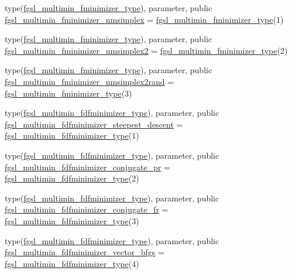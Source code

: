 \begin{DoxyCompactItemize}
\item 
type(\hyperlink{structfgsl_1_1fgsl__multimin__fminimizer__type}{fgsl\+\_\+multimin\+\_\+fminimizer\+\_\+type}), parameter, public \hyperlink{namespacefgsl_ab2e841755e0db0b740c913a9ca231417}{fgsl\+\_\+multimin\+\_\+fminimizer\+\_\+nmsimplex} = \hyperlink{structfgsl_1_1fgsl__multimin__fminimizer__type}{fgsl\+\_\+multimin\+\_\+fminimizer\+\_\+type}(1)
\item 
type(\hyperlink{structfgsl_1_1fgsl__multimin__fminimizer__type}{fgsl\+\_\+multimin\+\_\+fminimizer\+\_\+type}), parameter, public \hyperlink{namespacefgsl_a360e9e8ff70d499aedd5dbbdbdfd8404}{fgsl\+\_\+multimin\+\_\+fminimizer\+\_\+nmsimplex2} = \hyperlink{structfgsl_1_1fgsl__multimin__fminimizer__type}{fgsl\+\_\+multimin\+\_\+fminimizer\+\_\+type}(2)
\item 
type(\hyperlink{structfgsl_1_1fgsl__multimin__fminimizer__type}{fgsl\+\_\+multimin\+\_\+fminimizer\+\_\+type}), parameter, public \hyperlink{namespacefgsl_a1d64d873582c83a3e43c44d10ada296e}{fgsl\+\_\+multimin\+\_\+fminimizer\+\_\+nmsimplex2rand} = \hyperlink{structfgsl_1_1fgsl__multimin__fminimizer__type}{fgsl\+\_\+multimin\+\_\+fminimizer\+\_\+type}(3)
\item 
type(\hyperlink{structfgsl_1_1fgsl__multimin__fdfminimizer__type}{fgsl\+\_\+multimin\+\_\+fdfminimizer\+\_\+type}), parameter, public \hyperlink{namespacefgsl_a30855ab98d924e9fa284bc2d50170b82}{fgsl\+\_\+multimin\+\_\+fdfminimizer\+\_\+steepest\+\_\+descent} = \hyperlink{structfgsl_1_1fgsl__multimin__fdfminimizer__type}{fgsl\+\_\+multimin\+\_\+fdfminimizer\+\_\+type}(1)
\item 
type(\hyperlink{structfgsl_1_1fgsl__multimin__fdfminimizer__type}{fgsl\+\_\+multimin\+\_\+fdfminimizer\+\_\+type}), parameter, public \hyperlink{namespacefgsl_a8ac392b0c99b65482d4a3f6a8f719ed6}{fgsl\+\_\+multimin\+\_\+fdfminimizer\+\_\+conjugate\+\_\+pr} = \hyperlink{structfgsl_1_1fgsl__multimin__fdfminimizer__type}{fgsl\+\_\+multimin\+\_\+fdfminimizer\+\_\+type}(2)
\item 
type(\hyperlink{structfgsl_1_1fgsl__multimin__fdfminimizer__type}{fgsl\+\_\+multimin\+\_\+fdfminimizer\+\_\+type}), parameter, public \hyperlink{namespacefgsl_a94fc756d777c9358f808374b01e6a879}{fgsl\+\_\+multimin\+\_\+fdfminimizer\+\_\+conjugate\+\_\+fr} = \hyperlink{structfgsl_1_1fgsl__multimin__fdfminimizer__type}{fgsl\+\_\+multimin\+\_\+fdfminimizer\+\_\+type}(3)
\item 
type(\hyperlink{structfgsl_1_1fgsl__multimin__fdfminimizer__type}{fgsl\+\_\+multimin\+\_\+fdfminimizer\+\_\+type}), parameter, public \hyperlink{namespacefgsl_a98f35d82aab613681b886c2582cb98d2}{fgsl\+\_\+multimin\+\_\+fdfminimizer\+\_\+vector\+\_\+bfgs} = \hyperlink{structfgsl_1_1fgsl__multimin__fdfminimizer__type}{fgsl\+\_\+multimin\+\_\+fdfminimizer\+\_\+type}(4)

\end{DoxyCompactItemize}

